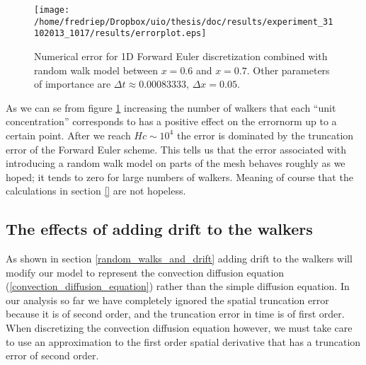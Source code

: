 \begin{figure}[H]
\centering
\texttt{[image: /home/fredriep/Dropbox/uio/thesis/doc/results/experiment\_31102013\_1017/results/errorplot.eps]}
\caption[Effect of increasing number of walkers]{Numerical error for 1D Forward Euler discretization combined with random walk model between $x=0.6$ and $x=0.7$. Other parameters of importance are $\Delta t\approx 0.00083333$, $\Delta x = 0.05$.}
\label{errorplot_FE1D_Walk_first_attemt}
\end{figure}

As we can se from figure \ref{errorplot_FE1D_Walk_first_attemt} increasing the number of walkers that each ``unit concentration'' corresponds to has a positive effect on the errornorm up to a certain point. 
After we reach $Hc \sim 10^4$ the error is dominated by the truncation error of the Forward Euler scheme. 
This tells us that the error associated with introducing a random walk model on parts of the mesh behaves roughly as we hoped; it tends to zero for large numbers of walkers. 
Meaning of course that the calculations in section \ref{} are not hopeless.



\subsection{The effects of adding drift to the walkers}\label{effect_of_drift_on_walkers}

As shown in section \ref{random_walks_and_drift} adding drift to the walkers will modify our model to represent the convection diffusion equation (\ref{convection_diffusion_equation}) rather than the simple diffusion equation. 
In our analysis so far we have completely ignored the spatial truncation error because it is of second order, and the truncation error in time is of first order. 
When discretizing the convection diffusion equation however, we must take care to use an approximation to the first order spatial derivative that has a truncation error of second order. 

